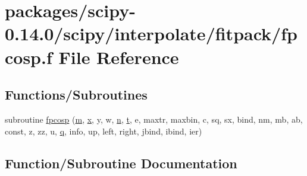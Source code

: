 \hypertarget{fpcosp_8f}{}\section{packages/scipy-\/0.14.0/scipy/interpolate/fitpack/fpcosp.f File Reference}
\label{fpcosp_8f}
\subsection*{Functions/\+Subroutines}
\begin{DoxyCompactItemize}
\item 
subroutine \hyperlink{fpcosp_8f_ae92cea1baf24ccce6d1827d92d7ab4cc}{fpcosp} (\hyperlink{indexexpr_8h_ab72fdb4031d47b75ab26dd18a437bcdc}{m}, \hyperlink{vecnorm1_8cc_ac73eed9e41ec09d58f112f06c2d6cb63}{x}, y, w, \hyperlink{indexexpr_8h_ab427e2e2b4d6cec55fa088ea2a692ace}{n}, \hyperlink{indexexpr_8h_a01709998b82be3f34e0412206618d09d}{t}, e, maxtr, maxbin, c, sq, sx, bind, nm, mb, ab, const, z, zz, u, \hyperlink{indexexpr_8h_ac886c3584e464b5533390d7440c9dd98}{q}, info, up, left, right, jbind, ibind, ier)
\end{DoxyCompactItemize}


\subsection{Function/\+Subroutine Documentation}
\hypertarget{fpcosp_8f_ae92cea1baf24ccce6d1827d92d7ab4cc}{}
